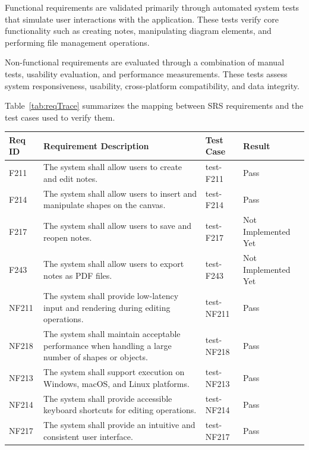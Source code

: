 \documentclass[12pt, titlepage]{article}
\begin{document}
Functional requirements are validated primarily through automated system
tests that simulate user interactions with the application. These tests
verify core functionality such as creating notes, manipulating diagram
elements, and performing file management operations.

Non-functional requirements are evaluated through a combination of manual
tests, usability evaluation, and performance measurements. These tests assess
system responsiveness, usability, cross-platform compatibility, and data
integrity.

Table~\ref{tab:reqTrace} summarizes the mapping between SRS requirements and
the test cases used to verify them.

\begin{table}[htbp]
\centering
\begin{tabular}{p{1.8cm} p{6.8cm} p{2.8cm} p{3.5cm}}
\toprule
\textbf{Req ID} & \textbf{Requirement Description} & \textbf{Test Case} & \textbf{Result} \\
\midrule

F211 & The system shall allow users to create and edit notes.
& test-F211 & Pass \\

F214 & The system shall allow users to insert and manipulate shapes on the canvas.
& test-F214 & Pass \\

F217 & The system shall allow users to save and reopen notes.
& test-F217 & Not Implemented Yet \\

F243 & The system shall allow users to export notes as PDF files.
& test-F243 & Not Implemented Yet \\

NF211 & The system shall provide low-latency input and rendering during editing operations.
& test-NF211 & Pass \\

NF218 & The system shall maintain acceptable performance when handling a large number of shapes or objects.
& test-NF218 & Pass \\

NF213 & The system shall support execution on Windows, macOS, and Linux platforms.
& test-NF213 & Pass \\

NF214 & The system shall provide accessible keyboard shortcuts for editing operations.
& test-NF214 & Pass \\

NF217 & The system shall provide an intuitive and consistent user interface.
& test-NF217 & Pass \\


\end{tabular}
\end{table}
\end{document}
